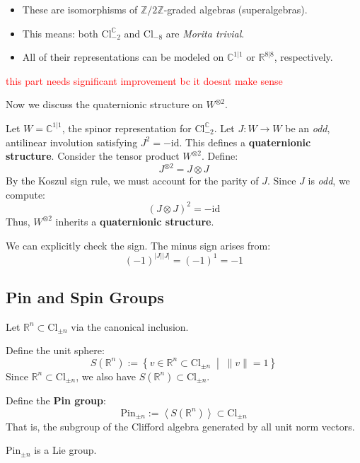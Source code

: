 \begin{itemize}
    \item These are isomorphisms of \(\mathbb{Z}/2\mathbb{Z}\)-graded algebras (superalgebras).
    \item This means: both $\mathrm{Cl}_{-2}^{\mathbb{C}}$ and $\mathrm{Cl}_{-8}$ are \emph{Morita trivial}.
    \item All of their representations can be modeled on $\mathbb{C}^{1|1}$ or $\mathbb{R}^{8|8}$, respectively.
\end{itemize}

\textcolor{red}{this part needs significant improvement bc it doesnt make sense}

Now we discuss the quaternionic structure on $W^{\otimes 2}$.

Let $W = \mathbb{C}^{1|1}$, the spinor representation for $\mathrm{Cl}_{-2}^{\mathbb{C}}$. Let $J : W \to W$ be an \emph{odd}, antilinear involution satisfying $J^2 = -\mathrm{id}$. This defines a \textbf{quaternionic structure}. Consider the tensor product $W^{\otimes 2}$. Define:
    \[
    J^{\otimes 2} = J \otimes J
    \]
By the Koszul sign rule, we must account for the parity of $J$. Since $J$ is \emph{odd}, we compute:
    \[
    (J \otimes J)^2 = -\mathrm{id}
    \]
Thus, $W^{\otimes 2}$ inherits a \textbf{quaternionic structure}. 

We can explicitly check the sign. The minus sign arises from:
\[
(-1)^{|J||J|} = (-1)^1 = -1
\]

\subsection{Pin and Spin Groups}
Let $\mathbb{R}^n \subset \mathrm{Cl}_{\pm n}$ via the canonical inclusion.

Define the unit sphere:
    \[
    S(\mathbb{R}^n) := \left\{ v \in \mathbb{R}^n \subset \mathrm{Cl}_{\pm n} \;\middle|\; \|v\| = 1 \right\}
    \]
Since $\mathbb{R}^n \subset \mathrm{Cl}_{\pm n}$, we also have $S(\mathbb{R}^n) \subset \mathrm{Cl}_{\pm n}$.

Define the \textbf{Pin group}:
    \[
    \mathrm{Pin}_{\pm n} := \left\langle S(\mathbb{R}^n) \right\rangle \subset \mathrm{Cl}_{\pm n}
    \]
    That is, the subgroup of the Clifford algebra generated by all unit norm vectors.

\begin{proposition}
    $\mathrm{Pin}_{\pm n}$ is a Lie group.
\end{proposition}


